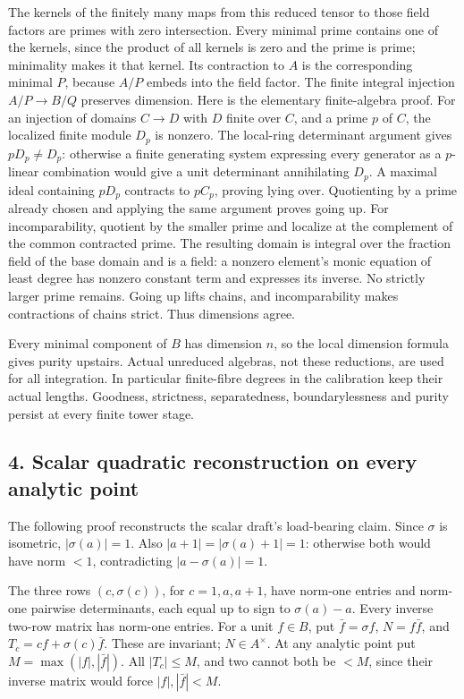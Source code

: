 \documentclass[
  11pt,
]{article}
\begin{document}
The kernels of the finitely many maps from this reduced tensor to those
field factors are primes with zero intersection. Every minimal prime
contains one of the kernels, since the product of all kernels is zero
and the prime is prime; minimality makes it that kernel. Its contraction
to \(A\) is the corresponding minimal \(P\), because \(A/P\) embeds into
the field factor. The finite integral injection \(A/P\to B/Q\) preserves
dimension. Here is the elementary finite-algebra proof. For an injection
of domains \(C\to D\) with \(D\) finite over \(C\), and a prime \(p\) of
\(C\), the localized finite module \(D_p\) is nonzero. The local-ring
determinant argument gives \(pD_p\ne D_p\): otherwise a finite
generating system expressing every generator as a \(p\)-linear
combination would give a unit determinant annihilating \(D_p\). A
maximal ideal containing \(pD_p\) contracts to \(pC_p\), proving lying
over. Quotienting by a prime already chosen and applying the same
argument proves going up. For incomparability, quotient by the smaller
prime and localize at the complement of the common contracted prime. The
resulting domain is integral over the fraction field of the base domain
and is a field: a nonzero element's monic equation of least degree has
nonzero constant term and expresses its inverse. No strictly larger
prime remains. Going up lifts chains, and incomparability makes
contractions of chains strict. Thus dimensions agree.

Every minimal component of \(B\) has dimension \(n\), so the local
dimension formula gives purity upstairs. Actual unreduced algebras, not
these reductions, are used for all integration. In particular
finite-fibre degrees in the calibration keep their actual lengths.
Goodness, strictness, separatedness, boundarylessness and purity persist
at every finite tower stage.

\subsection{4. Scalar quadratic reconstruction on every analytic
point}\label{scalar-quadratic-reconstruction-on-every-analytic-point}

The following proof reconstructs the scalar draft's load-bearing claim.
Since \(\sigma\) is isometric, \(|\sigma(a)|=1\). Also
\(|a+1|=|\sigma(a)+1|=1\): otherwise both would have norm \(<1\),
contradicting \(|a-\sigma(a)|=1\).

The three rows \((c,\sigma(c))\), for \(c=1,a,a+1\), have norm-one
entries and norm-one pairwise determinants, each equal up to sign to
\(\sigma(a)-a\). Every inverse two-row matrix has norm-one entries. For
a unit \(f\in B\), put \(\bar f=\sigma f\), \(N=f\bar f\), and
\(T_c=cf+\sigma(c)\bar f\). These are invariant; \(N\in A^\times\). At
any analytic point put \(M=\max(|f|,|\bar f|)\). All \(|T_c|\leq M\),
and two cannot both be \(<M\), since their inverse matrix would force
\(|f|,|\bar f|<M\).
\end{document}
